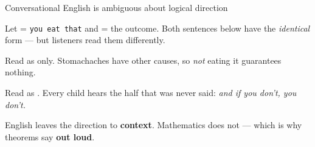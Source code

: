 \documentclass[10pt]{beamer}
\begin{document}
\begin{frame}{Conversational English is ambiguous about logical direction}

Let  = \texttt{you eat that} and  = the outcome.  Both sentences below
have the \textit{identical} form  --- but listeners read them differently.

\vfill
\pause
\begin{evidence}[blue]
\textbf{}
\vspace{-0.2em}

Read as  only.  Stomachaches have other causes, so \textit{not}
eating it guarantees nothing.
\end{evidence}

\pause
\begin{evidence}[orange]
\textbf{}
\vspace{-0.2em}

Read as .  Every child hears the half that was never said:
\textit{and if you don't, you don't.}
\end{evidence}

\pause
\vfill
{\centering English leaves the direction to \textbf{context}.  Mathematics does not ---
which is why theorems say  \textbf{out loud}.\par}


\end{frame}
\end{document}
